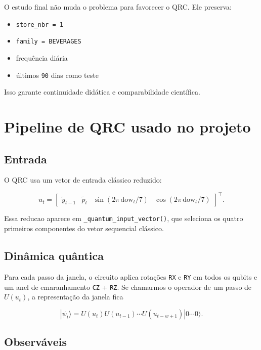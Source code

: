 \documentclass[12pt]{article}
\providecommand{\tightlist}{%
              \setlength{\itemsep}{0pt}\setlength{\parskip}{0pt}}
\begin{document}
O estudo final não muda o problema para favorecer o QRC. Ele preserva:

\begin{itemize}
\tightlist
\item
  \texttt{store\_nbr\ =\ 1}
\item
  \texttt{family\ =\ BEVERAGES}
\item
  frequência diária
\item
  últimos \texttt{90} dias como teste
\end{itemize}

Isso garante continuidade didática e comparabilidade científica.

\section{Pipeline de QRC usado no projeto}\label{3-pipeline-de-qrc-usado-no-projeto}

\subsection{Entrada}\label{31-entrada}

O QRC usa um vetor de entrada clássico reduzido:

\[
u_t =
\begin{bmatrix}
\widetilde{y}_{t-1} &
\widetilde{p}_t &
\sin(2\pi \, \mathrm{dow}_t / 7) &
\cos(2\pi \, \mathrm{dow}_t / 7)
\end{bmatrix}^\top.
\]

Essa reducao aparece em \texttt{\_quantum\_input\_vector()}, que seleciona os quatro primeiros componentes do vetor sequencial clássico.

\subsection{Dinâmica quântica}\label{32-dinuxe2mica-quuxe2ntica}

Para cada passo da janela, o circuito aplica rotações \texttt{RX} e \texttt{RY} em todos os qubits e um anel de emaranhamento \texttt{CZ} + \texttt{RZ}. Se chamarmos o operador de um passo de \(U(u_t)\), a representação da janela fica

\[
|\psi_t\rangle = U(u_t) U(u_{t-1}) \cdots U(u_{t-w+1}) |0 \cdots 0\rangle.
\]

\subsection{Observáveis}\label{33-observuxe1veis}
\end{document}
